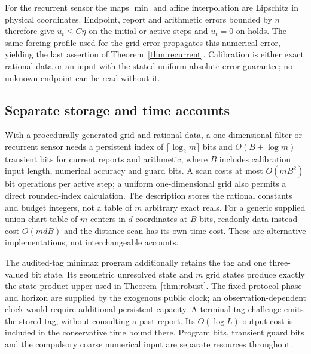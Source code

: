 For the recurrent sensor the maps $\min$ and affine interpolation are Lipschitz in physical coordinates. Endpoint, report and arithmetic errors bounded by $\eta$ therefore give $u_t\le C\eta$ on the initial or active steps and $u_t=0$ on holds. The same forcing profile used for the grid error propagates this numerical error, yielding the last assertion of Theorem~\ref{thm:recurrent}. Calibration is either exact rational data or an input with the stated uniform absolute-error guarantee; no unknown endpoint can be read without it.

\subsection{Separate storage and time accounts}
With a procedurally generated grid and rational data, a one-dimensional filter or recurrent sensor needs a persistent index of $\lceil\log_2m\rceil$ bits and $O(B+\log m)$ transient bits for current reports and arithmetic, where $B$ includes calibration input length, numerical accuracy and guard bits. A scan costs at most $O(mB^2)$ bit operations per active step; a uniform one-dimensional grid also permits a direct rounded-index calculation. The description stores the rational constants and budget integers, not a table of $m$ arbitrary exact reals. For a generic supplied union chart table of $m$ centers in $d$ coordinates at $B$ bits, readonly data instead cost $O(mdB)$ and the distance scan has its own time cost. These are alternative implementations, not interchangeable accounts.

The audited-tag minimax program additionally retains the tag and one three-valued bit state. Its geometric unresolved state and $m$ grid states produce exactly the state-product upper used in Theorem~\ref{thm:robust}. The fixed protocol phase and horizon are supplied by the exogenous public clock; an observation-dependent clock would require additional persistent capacity. A terminal tag challenge emits the stored tag, without consulting a past report. Its $O(\log L)$ output cost is included in the conservative time bound there. Program bits, transient guard bits and the compulsory coarse numerical input are separate resources throughout.
